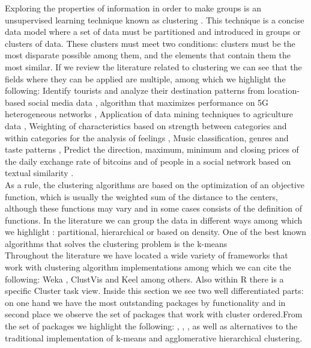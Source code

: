 Exploring the properties of information in order to make groups is an unsupervised learning technique known as clustering \citep{b46} \citep{b47}. This technique is a concise data model where a set of data must be partitioned and introduced in groups or clusters of data. These clusters must meet two conditions: clusters must be the most disparate possible among them, and the elements that contain them the most similar. If we review the literature related to clustering we can see that the fields where they can be applied are multiple, among which we highlight the following: Identify tourists and analyze their destination patterns from location-based social media data \citep{b1},  algorithm that maximizes performance on 5G heterogeneous networks \citep{b2}, Application of data mining techniques to agriculture data \citep{b3}, Weighting of characteristics based on strength between categories and within categories for the analysis of feelings \citep{b4}, Music classification, genres and taste patterns \citep{b5}, Predict the direction, maximum, minimum and closing prices of the daily exchange rate of bitcoins \citep{b6} and  of people in a social network based on textual similarity \citep{b7}.\\
As a rule, the clustering algorithms are based on the optimization of an objective function, which is usually the weighted sum of the distance to the centers, although these functions may vary and in some cases consists of the definition of functions. In the literature we can group the data in different ways among which we highlight \citep{b48}: partitional, hierarchical or based on density. One of the best known algorithms that solves the clustering problem is the k-means \citep{b49}\\
Throughout the literature we have located a wide variety of frameworks that work with clustering algorithm implementations among which we can cite the following: Weka \citep{b13}, ClustVis \citep{b14} and Keel \citep{b15} among others. Also within R there is a specific Cluster task view. Inside this section we see two well differentiated parts: on one hand we have the most outstanding packages by functionality and in second place we observe the set of packages that work with cluster ordered.From the set of packages we highlight the following:  \citep{b9},  \citep{b10},  \citep{b11},  \citep{b12} as well as alternatives to the traditional implementation of k-means and agglomerative hierarchical clustering.\\
